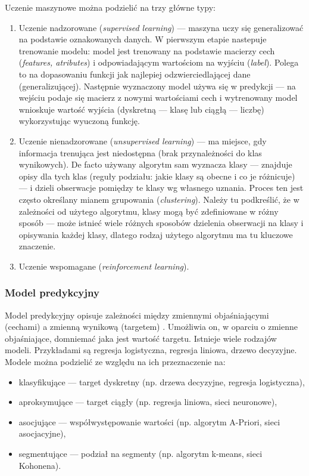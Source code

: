 Uczenie maszynowe można podzielić na trzy główne typy:
\begin{enumerate}
	\item Uczenie nadzorowane (\textit{supervised learning}) --- maszyna uczy się generalizować na podstawie oznakowanych danych. W pierwszym etapie nastepuje trenowanie modelu: model jest trenowany na podstawie macierzy cech (\textit{features, atributes}) i odpowiadającym wartościom na wyjściu (\textit{label}). Polega to na dopasowaniu funkcji jak najlepiej odzwierciedlającej dane (generalizującej). Następnie wyznaczony model używa się w predykcji --- na wejściu podaje się macierz z nowymi wartościami cech i wytrenowany model wnioskuje wartość wyjścia (dyskretną --- klasę lub ciągłą --- liczbę) wykorzystując wyuczoną funkcję.
	\item Uczenie nienadzorowane (\textit{unsupervised learning}) --- ma miejsce, gdy informacja trenująca jest niedostępna (brak przynależności do klas wynikowych). De facto używany algorytm sam wyznacza klasy --- znajduje opisy dla tych klas (reguły podziału: jakie klasy są obecne i co je różnicuje) --- i dzieli obserwacje pomiędzy te klasy wg własnego uznania. Proces ten jest często określany mianem grupowania (\textit{clustering}). Należy tu podkreślić, że w zależności od użytego algorytmu, klasy mogą być zdefiniowane w różny sposób --- może istnieć wiele różnych sposobów dzielenia obserwacji na klasy i opisywania każdej klasy, dlatego rodzaj użytego algorytmu ma tu kluczowe znaczenie.
	\item Uczenie wspomagane (\textit{reinforcement learning}).
\end{enumerate}

\subsubsection{Model predykcyjny}
Model predykcyjny opisuje zależności między zmiennymi objaśniającymi (cechami) a zmienną wynikową (targetem) \cite{website}. Umożliwia on, w oparciu o zmienne objaśniające, domniemać jaka jest wartość targetu. Istnieje wiele rodzajów modeli. Przykładami są regresja logistyczna, regresja liniowa, drzewo decyzyjne. \\

\noindent Modele można podzielić ze względu na ich przeznaczenie na:
\begin{itemize}
	\item klasyfikujące --- target dyskretny (np. drzewa decyzyjne, regresja logistyczna),
	\item aproksymujące --- target ciągły (np. regresja liniowa, sieci neuronowe),
	\item asocjujące --- współwystępowanie wartości (np. algorytm A-Priori, sieci asocjacyjne),
	\item segmentujące --- podział na segmenty (np. algorytm k-means, sieci Kohonena).
\end{itemize}

